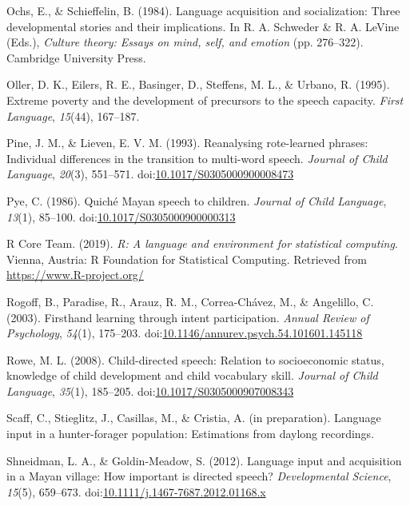 \documentclass[,man,floatsintext]{apa6}
\begin{document}
\hypertarget{ref-ochs1984language}{}
Ochs, E., \& Schieffelin, B. (1984). Language acquisition and
socialization: Three developmental stories and their implications. In R.
A. Schweder \& R. A. LeVine (Eds.), \emph{Culture theory: Essays on
mind, self, and emotion} (pp. 276--322). Cambridge University Press.

\hypertarget{ref-oller1995extreme}{}
Oller, D. K., Eilers, R. E., Basinger, D., Steffens, M. L., \& Urbano,
R. (1995). Extreme poverty and the development of precursors to the
speech capacity. \emph{First Language}, \emph{15}(44), 167--187.

\hypertarget{ref-pine1993reanalysing}{}
Pine, J. M., \& Lieven, E. V. M. (1993). Reanalysing rote-learned
phrases: Individual differences in the transition to multi-word speech.
\emph{Journal of Child Language}, \emph{20}(3), 551--571.
doi:\href{https://doi.org/10.1017/S0305000900008473}{10.1017/S0305000900008473}

\hypertarget{ref-pye1986quiche}{}
Pye, C. (1986). Quiché Mayan speech to children. \emph{Journal of Child
Language}, \emph{13}(1), 85--100.
doi:\href{https://doi.org/10.1017/S0305000900000313}{10.1017/S0305000900000313}

\hypertarget{ref-R-base}{}
R Core Team. (2019). \emph{R: A language and environment for statistical
computing}. Vienna, Austria: R Foundation for Statistical Computing.
Retrieved from \url{https://www.R-project.org/}

\hypertarget{ref-rogoff2003firsthand}{}
Rogoff, B., Paradise, R., Arauz, R. M., Correa-Chávez, M., \& Angelillo,
C. (2003). Firsthand learning through intent participation. \emph{Annual
Review of Psychology}, \emph{54}(1), 175--203.
doi:\href{https://doi.org/10.1146/annurev.psych.54.101601.145118}{10.1146/annurev.psych.54.101601.145118}

\hypertarget{ref-rowe2008child}{}
Rowe, M. L. (2008). Child-directed speech: Relation to socioeconomic
status, knowledge of child development and child vocabulary skill.
\emph{Journal of Child Language}, \emph{35}(1), 185--205.
doi:\href{https://doi.org/10.1017/S0305000907008343}{10.1017/S0305000907008343}

\hypertarget{ref-scaffIPlanguage}{}
Scaff, C., Stieglitz, J., Casillas, M., \& Cristia, A. (in preparation).
Language input in a hunter-forager population: Estimations from daylong
recordings.

\hypertarget{ref-shneidman2012language}{}
Shneidman, L. A., \& Goldin-Meadow, S. (2012). Language input and
acquisition in a Mayan village: How important is directed speech?
\emph{Developmental Science}, \emph{15}(5), 659--673.
doi:\href{https://doi.org/10.1111/j.1467-7687.2012.01168.x}{10.1111/j.1467-7687.2012.01168.x}
\end{document}
